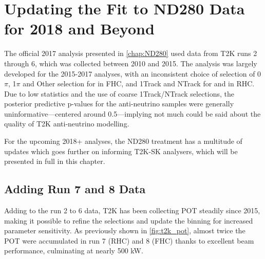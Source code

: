 \chapter{Updating the Fit to ND280 Data for 2018 and Beyond}
\label{chap:nd280_2018}
The official 2017 analysis presented in \autoref{chap:ND280} used data from T2K runs 2 through 6, which was collected between 2010 and 2015. The analysis was largely developed for the 2015-2017 analyses\cite{t2k_2015,t2k_2017}, with an inconsistent choice of selection of 0$\pi$, 1$\pi$ and Other selection for \numu in FHC, and 1Track and NTrack for \numubar and \numu in RHC. Due to low statistics and the use of coarse 1Track/NTrack selections, the posterior predictive p-values for the anti-neutrino samples were generally uninformative---centered around 0.5---implying not much could be said about the quality of T2K anti-neutrino modelling.

For the upcoming 2018+ analyses, the ND280 treatment has a multitude of updates which goes further on informing T2K-SK analysers, which will be presented in full in this chapter. 

\section{Adding Run 7 and 8 Data}
Adding to the run 2 to 6 data, T2K has been collecting POT steadily since 2015, making it possible to refine the selections and update the binning for increased parameter sensitivity. As previously shown in \autoref{fig:t2k_pot}, almost twice the POT were accumulated in run 7 (RHC) and 8 (FHC) thanks to excellent beam performance, culminating at nearly 500 kW.

